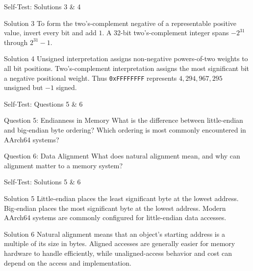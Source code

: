 \documentclass[aspectratio=169,11pt,t]{beamer}
\newcommand{\hex}[1]{\texttt{0x#1}}
\begin{document}
\begin{frame}{Self-Test: Solutions 3 \& 4}
\begin{block}{Solution 3}
To form the two's-complement negative of a representable positive value, invert every bit and add $1$.
A 32-bit two's-complement integer spans
$-2^{31}$ through $2^{31}-1$.
\end{block}
\vspace{0.3em}
\begin{block}{Solution 4}
Unsigned interpretation assigns non-negative powers-of-two weights to all bit positions.
Two's-complement interpretation assigns the most significant bit a negative positional weight.
Thus \hex{FFFFFFFF} represents $4,294,967,295$ unsigned but $-1$ signed.
\end{block}
\end{frame}






\begin{frame}{Self-Test: Questions 5 \& 6}
\begin{block}{Question 5: Endianness in Memory}
What is the difference between little-endian and big-endian byte ordering?
Which ordering is most commonly encountered in AArch64 systems?
\end{block}
\vspace{0.4em}
\begin{block}{Question 6: Data Alignment}
What does natural alignment mean, and why can alignment matter to a memory system?
\end{block}
\end{frame}






\begin{frame}{Self-Test: Solutions 5 \& 6}
\begin{block}{Solution 5}
Little-endian places the least significant byte at the lowest address.
Big-endian places the most significant byte at the lowest address.
Modern AArch64 systems are commonly configured for little-endian data accesses.
\end{block}
\vspace{0.3em}
\begin{block}{Solution 6}
Natural alignment means that an object's starting address is a multiple of its size in bytes.
Aligned accesses are generally easier for memory hardware to handle efficiently, while unaligned-access behavior and cost can depend on the access and implementation.
\end{block}
\end{frame}
\end{document}
